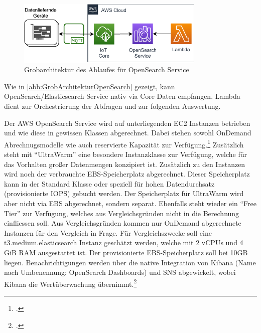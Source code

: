 \begin{figure}[H]
\centering
\includegraphics[width=0.8\textwidth]{graphics/OpenSearch-general.pdf}
\caption{Grobarchitektur des Ablaufes für OpenSearch Service}
\label{abb:GrobArchitekturOpenSearch}
\end{figure}
Wie in \autoref{abb:GrobArchitekturOpenSearch} gezeigt, kann OpenSearch/Elasticsearch Service nativ via \AWSIOT{} Core Daten empfangen. Lambda dient zur Orchestrierung der Abfragen und zur folgenden Auswertung.

Der \ac{AWS} OpenSearch Service wird auf unterliegenden \ac{EC2} Instanzen betrieben und wie diese in gewissen Klassen abgerechnet. Dabei stehen sowohl OnDemand Abrechnugsmodelle wie auch reservierte Kapazität zur Verfügung.\footcite[Vgl. auch im Folgenden][]{AmazonWebServicesInc..o.J.w} Zusätzlich steht mit \enquote{UltraWarm} eine besondere Instanzklasse zur Verfügung, welche für das Vorhalten großer Datenmengen konzipiert ist. Zusätzlich zu den Instanzen wird noch der verbrauchte \ac{EBS}-Speicherplatz abgerechnet. Dieser Speicherplatz kann in der Standard Klasse oder speziell für hohen Datendurchsatz (provisionierte \ac{IOPS}) gebucht werden. Der Speicherplatz für UltraWarm wird aber nicht via \ac{EBS} abgerechnet, sondern separat. Ebenfalls steht wieder ein \enquote{Free Tier} zur Verfügung, welches aus Vergleichsgründen nicht in die Berechnung einfliessen soll. Aus Vergleichsgründen kommen nur OnDemand abgerechnete Instanzen für den Vergleich in Frage. Für Vergleichszwecke soll eine t3.medium.elasticsearch Instanz geschätzt werden, welche mit 2 vCPUs und 4 GiB \ac{RAM} ausgestattet ist. Der provisionierte \ac{EBS}-Speicherplatz soll bei 10GB liegen.
Benachrichtigungen werden über die native Integration von Kibana (Name nach Umbenennung: OpenSearch Dashboards) und \ac{SNS} abgewickelt, wobei Kibana die Wertüberwachung übernimmt.\footcite[Vgl.][]{AmazonWebServicesInc..o.J.x}

